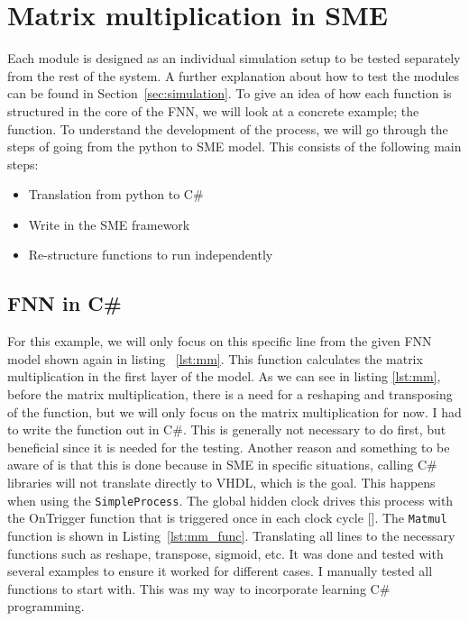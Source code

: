 \newpage

\section{Matrix multiplication in SME}
Each module is designed as an individual simulation setup to be tested separately from the rest of the system. A further explanation about how to test the modules can be found in Section~\ref{sec:simulation}.
To give an idea of how each function is structured in the core of the FNN, we will look at a concrete example; the  function. 
To understand the development of the process, we will go through the steps of going from the python to SME model. This consists of the following main steps:

\begin{itemize}
    \item Translation from python to C\#
    \item Write in the SME framework
    \item Re-structure functions to run independently
\end{itemize}

\subsection{FNN in C\#}
For this example, we will only focus on this specific line from the given FNN model shown again in listing ~\ref{lst:mm}. This function calculates the matrix multiplication in the first layer of the model.
As we can see in listing \ref{lst:mm}, before the matrix multiplication, there is a need for a reshaping and transposing of the function, but we will only focus on the matrix multiplication for now. 
I had to write the function out in C\#.
This is generally not necessary to do first, but beneficial since it is needed for the testing. Another reason and something to be aware of is that this is done because in SME in specific situations, calling C\# libraries will not translate directly to VHDL, which is the goal. This happens when using the \texttt{SimpleProcess}. The global hidden clock drives this process with the OnTrigger function that is triggered once in each clock cycle [\cite{LennartJones}].
The \texttt{Matmul} function is shown in Listing~\ref{lst:mm_func}. Translating all lines to the necessary functions such as reshape, transpose, sigmoid, etc. It was done and tested with several examples to ensure it worked for different cases. I manually tested all functions to start with. This was my way to incorporate learning C\# programming. \\

